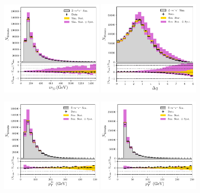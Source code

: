 \begin{figure}[h!]
    \begin{center}
        \includegraphics[width=0.45\textwidth]{figures/appendix_zee/dijet_mass_zee_LPS.pdf}
        \includegraphics[width=0.45\textwidth]{figures/appendix_zee/delta_eta_zee_LPS.pdf}
    \end{center}
    \begin{center}
        \includegraphics[width=0.45\textwidth]{figures/appendix_zee/lead_jet_pt_zee_LPS.pdf}
        \includegraphics[width=0.45\textwidth]{figures/appendix_zee/sublead_jet_pt_zee_LPS.pdf}

\end{center}
\end{figure}
